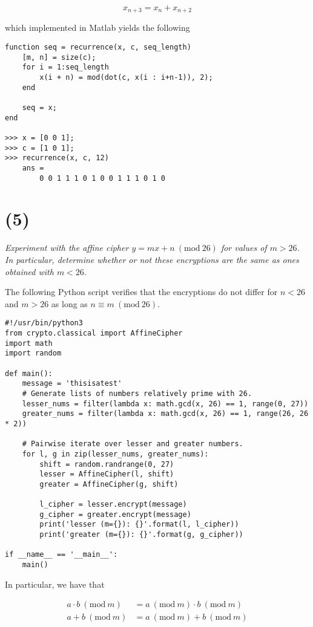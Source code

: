 \documentclass[12pt]{article}
\renewcommand{\mod}[1]{\mathrm{mod}\ #1}
\renewcommand{\pmod}[1]{\ (\mod{#1})}
\begin{document}
$$x_{n + 3} = x_n + x_{n + 2}$$

which implemented in Matlab yields the following

\begin{verbatim}
function seq = recurrence(x, c, seq_length)
    [m, n] = size(c);
    for i = 1:seq_length
        x(i + n) = mod(dot(c, x(i : i+n-1)), 2);
    end

    seq = x;
end

>>> x = [0 0 1];
>>> c = [1 0 1];
>>> recurrence(x, c, 12)
    ans =
        0 0 1 1 1 0 1 0 0 1 1 1 0 1 0
\end{verbatim}

\section*{(5)} \textit{Experiment with the affine cipher $y = m x + n \pmod{26}$ for values of $m > 26$. In particular, determine whether or not these encryptions are the same as ones obtained with $m < 26$.}

The following Python script verifies that the encryptions do not differ for $n < 26$ and $m > 26$ as long as $n \equiv m \pmod{26}$.

\begin{verbatim}
#!/usr/bin/python3
from crypto.classical import AffineCipher
import math
import random

def main():
    message = 'thisisatest'
    # Generate lists of numbers relatively prime with 26.
    lesser_nums = filter(lambda x: math.gcd(x, 26) == 1, range(0, 27))
    greater_nums = filter(lambda x: math.gcd(x, 26) == 1, range(26, 26 * 2))

    # Pairwise iterate over lesser and greater numbers.
    for l, g in zip(lesser_nums, greater_nums):
        shift = random.randrange(0, 27)
        lesser = AffineCipher(l, shift)
        greater = AffineCipher(g, shift)

        l_cipher = lesser.encrypt(message)
        g_cipher = greater.encrypt(message)
        print('lesser (m={}): {}'.format(l, l_cipher))
        print('greater (m={}): {}'.format(g, g_cipher))

if __name__ == '__main__':
    main()
\end{verbatim}

In particular, we have that

\begin{align*}
    a \cdot b \pmod{m} &= a \pmod{m} \cdot b \pmod{m}\\
    a + b \pmod{m} &= a \pmod{m} + b \pmod{m}\\
\end{align*}
\end{document}
